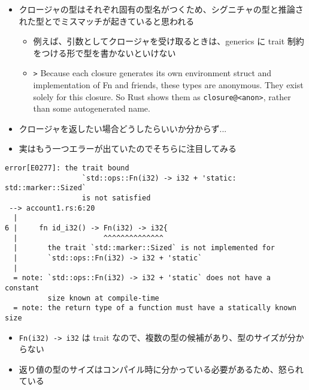 \documentclass[dvipdfmx,11pt]{beamer}
\begin{document}
\begin{frame}[fragile]
  \begin{itemize}
  \item クロージャの型はそれぞれ固有の型名がつくため、シグニチャの型と推論された型とでミスマッチが起きていると思われる
    \begin{itemize}
    \item 例えば、引数としてクロージャを受け取るときは、generics に trait 制約をつける形で型を書かないといけない
    \item \verb+>+ Because each closure generates its own environment struct and implementation of Fn and friends, these types are anonymous. They exist solely for this closure. So Rust shows them as \verb+closure@<anon>+, rather than some autogenerated name.
    \end{itemize}
  \item クロージャを返したい場合どうしたらいいか分からず...
  \end{itemize}
\end{frame}

\begin{frame}[fragile]
  \begin{itemize}
  \item 実はもう一つエラーが出ていたのでそちらに注目してみる
  \end{itemize}
  \begin{Verbatim}[fontsize=\scriptsize]
    error[E0277]: the trait bound
                  `std::ops::Fn(i32) -> i32 + 'static: std::marker::Sized`
                  is not satisfied
 --> account1.rs:6:20
  |
6 |     fn id_i32() -> Fn(i32) -> i32{
  |                    ^^^^^^^^^^^^^^
  |       the trait `std::marker::Sized` is not implemented for
  |       `std::ops::Fn(i32) -> i32 + 'static`
  |
  = note: `std::ops::Fn(i32) -> i32 + 'static` does not have a constant
          size known at compile-time
  = note: the return type of a function must have a statically known size
    \end{Verbatim}
  \begin{itemize}
  \item \verb+Fn(i32) -> i32+ は trait なので、複数の型の候補があり、型のサイズが分からない
  \item 返り値の型のサイズはコンパイル時に分かっている必要があるため、怒られている
  \end{itemize}
\end{frame}
\end{document}

